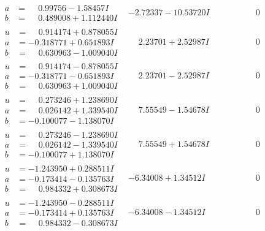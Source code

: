 \documentclass[1p]{elsarticle_modified}
\theoremstyle{definition}
\begin{document}
$$\begin{array}{c|c|c}
\begin{aligned}
a &= \phantom{-}0.99756 - 1.58457 I \\
b &= \phantom{-}0.489008 + 1.112440 I\end{aligned}
 & -2.72337 - 10.53720 I & \phantom{-0.000000 } 0 \\ \hline\begin{aligned}
u &= \phantom{-}0.914174 + 0.878055 I \\
a &= -0.318771 + 0.651893 I \\
b &= \phantom{-}0.630963 - 1.009040 I\end{aligned}
 & \phantom{-}2.23701 + 2.52987 I & \phantom{-0.000000 } 0 \\ \hline\begin{aligned}
u &= \phantom{-}0.914174 - 0.878055 I \\
a &= -0.318771 - 0.651893 I \\
b &= \phantom{-}0.630963 + 1.009040 I\end{aligned}
 & \phantom{-}2.23701 - 2.52987 I & \phantom{-0.000000 } 0 \\ \hline\begin{aligned}
u &= \phantom{-}0.273246 + 1.238690 I \\
a &= \phantom{-}0.026142 + 1.339540 I \\
b &= -0.100077 - 1.138070 I\end{aligned}
 & \phantom{-}7.55549 - 1.54678 I & \phantom{-0.000000 } 0 \\ \hline\begin{aligned}
u &= \phantom{-}0.273246 - 1.238690 I \\
a &= \phantom{-}0.026142 - 1.339540 I \\
b &= -0.100077 + 1.138070 I\end{aligned}
 & \phantom{-}7.55549 + 1.54678 I & \phantom{-0.000000 } 0 \\ \hline\begin{aligned}
u &= -1.243950 + 0.288511 I \\
a &= -0.173414 - 0.135763 I \\
b &= \phantom{-}0.984332 + 0.308673 I\end{aligned}
 & -6.34008 + 1.34512 I & \phantom{-0.000000 } 0 \\ \hline\begin{aligned}
u &= -1.243950 - 0.288511 I \\
a &= -0.173414 + 0.135763 I \\
b &= \phantom{-}0.984332 - 0.308673 I\end{aligned}
 & -6.34008 - 1.34512 I & \phantom{-0.000000 } 0 \\ \hline\begin{aligned}

\end{aligned}
\end{array}$$
\end{document}
